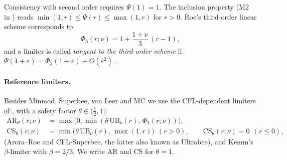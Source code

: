 \documentclass[11pt]{article}
\newcommand{\UB}{\mathrm{UB}}
\theoremstyle{plain}
\theoremstyle{definition}
\begin{document}
Consistency with second order requires $\Psi(1)=1$. The inclusion property (M2 in \cite{Kemm2011}) reads $\min(1,r)\le\Psi(r)\le\max(1,r)$ for $r>0$. Roe's third-order linear scheme corresponds to
\begin{equation}\label{eq:phi3}
\Phi_3(r;\nu)=1+\frac{1+\nu}{3}\,(r-1),
\end{equation}
and a limiter is called \emph{tangent to the third-order scheme} if $\Psi(1+\varepsilon)=\Phi_3(1+\varepsilon)+O(\varepsilon^2)$ \cite{Roe1986,AroraRoe1997,Kemm2011}.

\paragraph{Reference limiters.} Besides Minmod, Superbee, van Leer and MC we use the CFL-dependent limiters of \cite{AroraRoe1997,Kemm2011}, with a safety factor $\theta\in(\frac12,1]$:
\begin{align}
\mathrm{AR}_\theta(r;\nu)&=\max\bigl(0,\min(\theta\,\UB_\nu(r),\,\Phi_3(r;\nu))\bigr), \label{eq:AR}\\
\mathrm{CS}_\theta(r;\nu)&=\min\bigl(\theta\,\UB_\nu(r),\,\max(1,r)\bigr)\ \ (r>0),\qquad \mathrm{CS}_\theta(r;\nu)=0\ \ (r\le0), \label{eq:CS}
\end{align}
(Arora--Roe and CFL-Superbee, the latter also known as Ultrabee), and Kemm's $\beta$-limiter \cite[eq.~(43)]{Kemm2011} with $\beta=2/3$. We write AR and CS for $\theta=1$.
\end{document}
